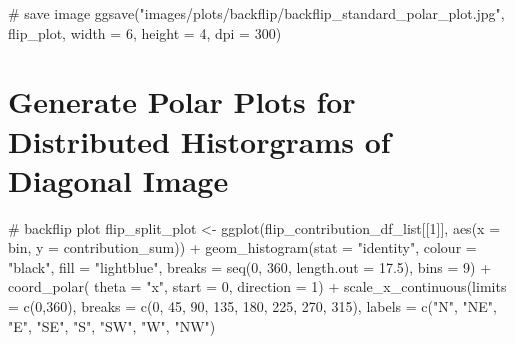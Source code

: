 \documentclass[
  letterpaper,
  DIV=11,
  numbers=noendperiod]{scrreprt}
\newenvironment{Shaded}{\begin{snugshade}}{\end{snugshade}}
\newcommand{\AttributeTok}[1]{\textcolor[rgb]{0.40,0.45,0.13}{#1}}
\newcommand{\CommentTok}[1]{\textcolor[rgb]{0.37,0.37,0.37}{#1}}
\newcommand{\DecValTok}[1]{\textcolor[rgb]{0.68,0.00,0.00}{#1}}
\newcommand{\FloatTok}[1]{\textcolor[rgb]{0.68,0.00,0.00}{#1}}
\newcommand{\FunctionTok}[1]{\textcolor[rgb]{0.28,0.35,0.67}{#1}}
\newcommand{\NormalTok}[1]{\textcolor[rgb]{0.00,0.23,0.31}{#1}}
\newcommand{\OtherTok}[1]{\textcolor[rgb]{0.00,0.23,0.31}{#1}}
\newcommand{\SpecialCharTok}[1]{\textcolor[rgb]{0.37,0.37,0.37}{#1}}
\newcommand{\StringTok}[1]{\textcolor[rgb]{0.13,0.47,0.30}{#1}}
\begin{document}
\begin{Shaded}
\begin{Highlighting}[]
\CommentTok{\# save image}
\FunctionTok{ggsave}\NormalTok{(}\StringTok{"images/plots/backflip/backflip\_standard\_polar\_plot.jpg"}\NormalTok{, flip\_plot, }\AttributeTok{width =} \DecValTok{6}\NormalTok{, }\AttributeTok{height =} \DecValTok{4}\NormalTok{, }\AttributeTok{dpi =} \DecValTok{300}\NormalTok{)}
\end{Highlighting}
\end{Shaded}

\section{Generate Polar Plots for Distributed Historgrams of Diagonal
Image}\label{generate-polar-plots-for-distributed-historgrams-of-diagonal-image}

\begin{Shaded}
\begin{Highlighting}[]
\CommentTok{\# backflip plot}
\NormalTok{flip\_split\_plot }\OtherTok{\textless{}{-}}
  \FunctionTok{ggplot}\NormalTok{(flip\_contribution\_df\_list[[}\DecValTok{1}\NormalTok{]],}
         \FunctionTok{aes}\NormalTok{(}\AttributeTok{x =}\NormalTok{ bin, }\AttributeTok{y =}\NormalTok{ contribution\_sum)) }\SpecialCharTok{+}
  \FunctionTok{geom\_histogram}\NormalTok{(}\AttributeTok{stat =} \StringTok{"identity"}\NormalTok{,}
                 \AttributeTok{colour =} \StringTok{"black"}\NormalTok{,}
                 \AttributeTok{fill =} \StringTok{"lightblue"}\NormalTok{,}
                 \AttributeTok{breaks =} \FunctionTok{seq}\NormalTok{(}\DecValTok{0}\NormalTok{, }\DecValTok{360}\NormalTok{, }\AttributeTok{length.out =} \FloatTok{17.5}\NormalTok{),}
                 \AttributeTok{bins =} \DecValTok{9}\NormalTok{) }\SpecialCharTok{+}
  \FunctionTok{coord\_polar}\NormalTok{(}
    \AttributeTok{theta =} \StringTok{"x"}\NormalTok{,}
    \AttributeTok{start =} \DecValTok{0}\NormalTok{,}
    \AttributeTok{direction =} \DecValTok{1}\NormalTok{) }\SpecialCharTok{+}
  \FunctionTok{scale\_x\_continuous}\NormalTok{(}\AttributeTok{limits =} \FunctionTok{c}\NormalTok{(}\DecValTok{0}\NormalTok{,}\DecValTok{360}\NormalTok{),}
    \AttributeTok{breaks =} \FunctionTok{c}\NormalTok{(}\DecValTok{0}\NormalTok{, }\DecValTok{45}\NormalTok{, }\DecValTok{90}\NormalTok{, }\DecValTok{135}\NormalTok{, }\DecValTok{180}\NormalTok{, }\DecValTok{225}\NormalTok{, }\DecValTok{270}\NormalTok{, }\DecValTok{315}\NormalTok{),}
    \AttributeTok{labels =} \FunctionTok{c}\NormalTok{(}\StringTok{"N"}\NormalTok{, }\StringTok{"NE"}\NormalTok{, }\StringTok{"E"}\NormalTok{, }\StringTok{"SE"}\NormalTok{, }\StringTok{"S"}\NormalTok{, }\StringTok{"SW"}\NormalTok{, }\StringTok{"W"}\NormalTok{, }\StringTok{"NW"}\NormalTok{)}

\end{Highlighting}
\end{Shaded}
\end{document}
